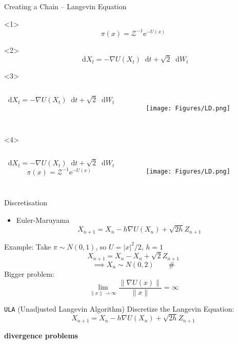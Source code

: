 \documentclass[aspectratio=169]{beamer}
\newcommand{\dif}{\mathop{}\!\mathrm{d}}
\newcommand{\e}{\mathrm{e}}
\newcommand{\grad}{\nabla}
\begin{document}
\begin{frame}{Creating a Chain -- Langevin Equation}
\begin{onlyenv}<1>
    $$\pi(x)=\mathcal{Z}^{-1} \e^{-U(x)} $$
\end{onlyenv}
\begin{onlyenv}<2>
    $$\dif X_t = -\grad U(X_t) \dif t +\sqrt{2}\dif W_t $$
\end{onlyenv}
\begin{onlyenv}<3>
\begin{columns}
    $$\dif X_t = -\grad U(X_t) \dif t +\sqrt{2}\dif W_t $$
\begin{figure}
    \centering
    \texttt{[image: Figures/LD.png]}
\end{figure}
\end{columns}
\end{onlyenv}
\begin{onlyenv}<4>
\begin{columns}
    $$\dif X_t = -\grad U(X_t) \dif t +\sqrt{2}\dif W_t $$
        $$\pi(x)=\mathcal{Z}^{-1} \e^{-U(x)} $$
\begin{figure}
    \centering
    \texttt{[image: Figures/LD.png]}
\end{figure}
\end{columns}
\end{onlyenv}
\end{frame}

\begin{frame}{Discretisation}

    \begin{itemize}
        \item Euler-Maruyama  \[X_{n+1} = X_n - h\grad U(X_n)  + \sqrt{2h}Z_{n+1}\]
    \end{itemize}
    \pause
    Example: Take \(\pi\sim N(0,1)\), so $U=|x| ^2/2,\, h=1$ \\
    \pause 
    $$X_{n+1} =X_n - X_n +\sqrt{2}Z_{n+1} $$
    \pause 
    $$\implies X_n \sim N(0,2)\qquad \# $$
 \pause
 Bigger problem:
 \[\lim_{\lVert x\rVert \to \infty}\frac{\lVert \grad U(x)\rVert }{\lVert x \rVert} = \infty  \]

\end{frame}

\begin{frame}{\texttt{ULA} (Unadjusted Langevin Algorithm)}
    Discretize the Langevin Equation:
     \[X_{n+1} = X_n - h\grad U(X_n)  + \sqrt{2h}Z_{n+1}\]
     \[\]
     \[\]
      \centerline{\textbf{divergence problems}}
\end{frame}
\end{document}
